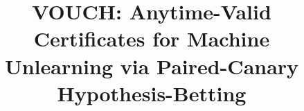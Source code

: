 \documentclass[pdflatex,sn-mathphys-num]{sn-jnl}
\theoremstyle{thmstyleone}
\theoremstyle{thmstyletwo}
\theoremstyle{thmstylethree}
\newcommand{\eps}{\varepsilon}
\providecommand{\DIFaddbegin}{} %
\providecommand{\DIFaddend}{} %
\providecommand{\DIFdelbegin}{} %
\providecommand{\DIFdelend}{} %
\newcommand{\DIFscaledelfig}{0.5}
\newlength{\DIFdelgraphicswidth} %
\newlength{\DIFdelgraphicsheight} %
\newcommand{\DIFaddincludegraphics}[2][]{{\color{blue}\fbox{\DIFOincludegraphics[#1]{#2}}}} %
\newcommand{\DIFdelincludegraphics}[2][]{%
\sbox{\DIFdelgraphicsbox}{\DIFOincludegraphics[#1]{#2}}%
\settoboxwidth{\DIFdelgraphicswidth}{\DIFdelgraphicsbox} %
\settoboxtotalheight{\DIFdelgraphicsheight}{\DIFdelgraphicsbox} %
\scalebox{\DIFscaledelfig}{%
\parbox[b]{\DIFdelgraphicswidth}{\usebox{\DIFdelgraphicsbox}\\[-\baselineskip] \rule{\DIFdelgraphicswidth}{0em}}\llap{\resizebox{\DIFdelgraphicswidth}{\DIFdelgraphicsheight}{%
\setlength{\unitlength}{\DIFdelgraphicswidth}%
\begin{picture}(1,1)%
\thicklines\linethickness{2pt} %
{\color[rgb]{1,0,0}\put(0,0){\framebox(1,1){}}}%
{\color[rgb]{1,0,0}\put(0,0){\line( 1,1){1}}}%
{\color[rgb]{1,0,0}\put(0,1){\line(1,-1){1}}}%
\end{picture}%
}\hspace*{3pt}}} %
} %
\DeclareRobustCommand{\DIFaddbegin}{\DIFOaddbegin \let\includegraphics\DIFaddincludegraphics} %
\DeclareRobustCommand{\DIFaddend}{\DIFOaddend \let\includegraphics\DIFOincludegraphics} %
\DeclareRobustCommand{\DIFdelbegin}{\DIFOdelbegin \let\includegraphics\DIFdelincludegraphics} %
\DeclareRobustCommand{\DIFdelend}{\DIFOaddend \let\includegraphics\DIFOincludegraphics} %
\begin{document}
\title[Anytime-Valid Certificates for Machine Unlearning]{VOUCH: Anytime-Valid Certificates for Machine Unlearning via Paired-Canary Hypothesis-Betting}

\newif\ifanon
\DIFdelbegin %
\DIFdelend \DIFaddbegin \anonfalse
\DIFaddend 

\ifanon
\author*[1]{\sur{Anonymous Author}}
\affil*[1]{\orgname{Blinded for double-blind review}}
\else
\author*[1]{ }
\fi

\DIFdelbegin %
\end{document}
